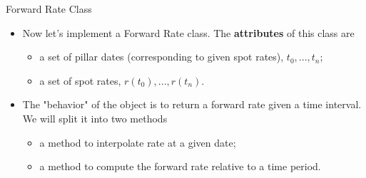\documentclass{beamer}
\begin{document}
\begin{frame}{Forward Rate Class}
  \begin{itemize}
  \item Now let's implement a Forward Rate class. The \textbf{attributes} of this class are
      \begin{itemize}
      \item a set of pillar dates (corresponding to given spot rates), $t_0,...,t_{n}$;
      \item a set of spot rates, $r(t_0),...,r(t_{n})$.
      \end{itemize}
  \item The "behavior" of the object is to return a forward rate given a time interval. We will split it into two methods
    \begin{itemize}
    \item a method to interpolate rate at a given date; 
    \item a method to compute the forward rate relative to a time period.
    \end{itemize}
  \end{itemize}
\end{frame}

%
%    
%
%
%
%
\end{document}
